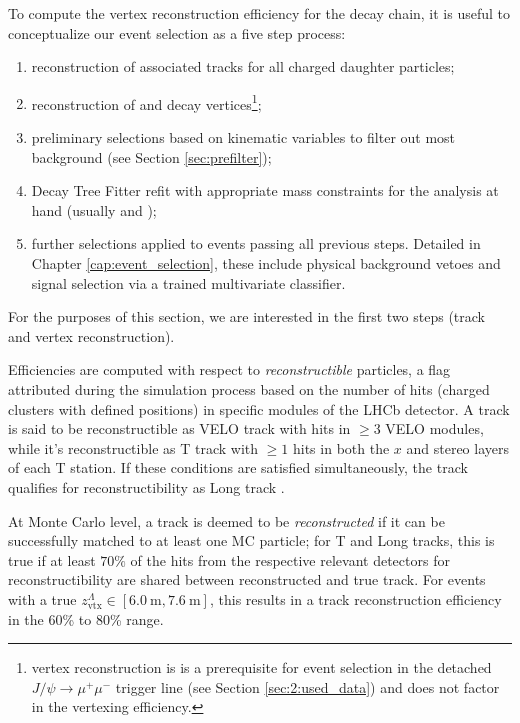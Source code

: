 To compute the vertex reconstruction efficiency for the \lbz decay chain, it is useful to conceptualize our event selection as a five step process:
\begin{enumerate}
	\item reconstruction of associated tracks for all charged daughter particles;
	\item reconstruction of \lz and \lbz decay vertices\footnote{\jpsi vertex reconstruction is is a prerequisite for event selection in the detached $J/\psi\rightarrow \mu^+ \mu^-$ trigger line (see Section \ref{sec:2:used_data}) and does not factor in the vertexing efficiency.};
	\item preliminary selections based on kinematic variables to filter out most background (see Section \ref{sec:prefilter});
	\item Decay Tree Fitter refit with appropriate mass constraints for the analysis at hand (usually \jpsi and \lz);
	\item further selections applied to events passing all previous steps. Detailed in Chapter \ref{cap:event_selection}, these include physical background vetoes and signal selection via a trained multivariate classifier.
\end{enumerate}

For the purposes of this section, we are interested in the first two steps (track and vertex reconstruction).

Efficiencies are computed with respect to \textit{reconstructible} particles, a flag attributed during the simulation process based on the number of hits (charged clusters with defined positions) in specific modules of the LHCb detector.
A track is said to be reconstructible as VELO track with hits in $\geq 3$ VELO modules, while it's reconstructible as T track with $\geq 1$ hits in both the $x$ and stereo layers of each T station.
If these conditions are satisfied simultaneously, the track qualifies for reconstructibility as Long track \cite{Li:2752971}.

At Monte Carlo level, a track is deemed to be \textit{reconstructed} if it can be successfully matched to at least one MC particle;
for T and Long tracks, this is true if at least $70\%$ of the hits from the respective relevant detectors for reconstructibility are shared between reconstructed and true track. For \demonstratorshort events with a true $z_\text{vtx}^\Lambda \in [\SI{6.0}{\meter}, \SI{7.6}{\meter}]$, this results in a track reconstruction efficiency in the 60\% to 80\% range.

